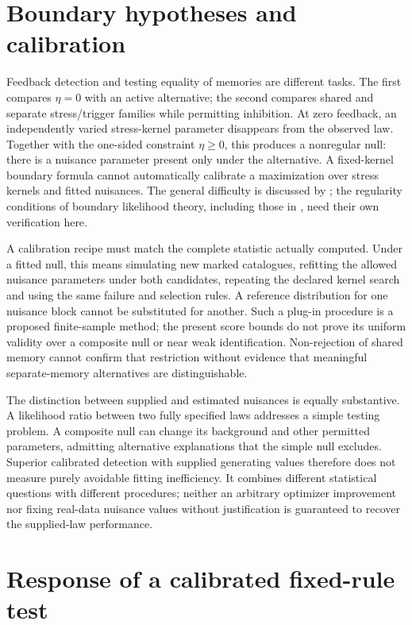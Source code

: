 \section{Boundary hypotheses and calibration}
\label{sec:boundary_calibration}

Feedback detection and testing equality of memories are different tasks. The first compares \(\eta=0\) with an active alternative; the second compares shared and separate stress/trigger families while permitting inhibition. At zero feedback, an independently varied stress-kernel parameter disappears from the observed law. Together with the one-sided constraint \(\eta\ge0\), this produces a nonregular null: there is a nuisance parameter present only under the alternative. A fixed-kernel boundary formula cannot automatically calibrate a maximization over stress kernels and fitted nuisances. The general difficulty is discussed by \citet{Davies1977}; the regularity conditions of boundary likelihood theory, including those in \citet{SelfLiang1987}, need their own verification here.

A calibration recipe must match the complete statistic actually computed. Under a fitted null, this means simulating new marked catalogues, refitting the allowed nuisance parameters under both candidates, repeating the declared kernel search and using the same failure and selection rules. A reference distribution for one nuisance block cannot be substituted for another. Such a plug-in procedure is a proposed finite-sample method; the present score bounds do not prove its uniform validity over a composite null or near weak identification. Non-rejection of shared memory cannot confirm that restriction without evidence that meaningful separate-memory alternatives are distinguishable.

The distinction between supplied and estimated nuisances is equally substantive. A likelihood ratio between two fully specified laws addresses a simple testing problem. A composite null can change its background and other permitted parameters, admitting alternative explanations that the simple null excludes. Superior calibrated detection with supplied generating values therefore does not measure purely avoidable fitting inefficiency. It combines different statistical questions with different procedures; neither an arbitrary optimizer improvement nor fixing real-data nuisance values without justification is guaranteed to recover the supplied-law performance.

\section{Response of a calibrated fixed-rule test}

